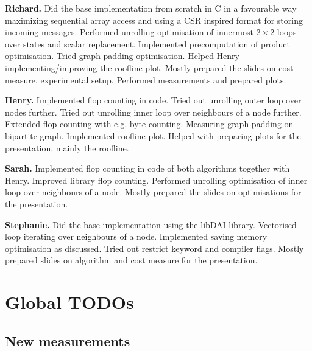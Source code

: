 \documentclass[letterpaper]{article}
\newcommand{\mypar}[1]{{\bf #1.}}
\begin{document}

\mypar{Richard} Did the base implementation from scratch in C in a favourable way maximizing sequential array access and using a CSR inspired format for storing incoming messages. Performed unrolling optimisation of innermost $2\times2$ loops over states and scalar replacement. Implemented precomputation of product optimisation. Tried graph padding optimisation. Helped Henry implementing/improving the roofline plot. Mostly prepared the slides on cost measure, experimental setup. Performed measurements and prepared plots.

\mypar{Henry} Implemented flop counting in code. Tried out unrolling outer loop over nodes further. Tried out unrolling inner loop over neighbours of a node further. Extended flop counting with e.g. byte counting. Measuring graph padding on bipartite graph. Implemented roofline plot. Helped with preparing plots for the presentation, mainly the roofline.

\mypar{Sarah} Implemented flop counting in code of both algorithms together with Henry. Improved library flop counting. Performed unrolling optimisation of inner loop over neighbours of a node. Mostly prepared the slides on optimisations for the presentation.

\mypar{Stephanie} Did the base implementation using the libDAI library. Vectorised loop iterating over neighbours of a node. Implemented saving memory optimisation as discussed. Tried out restrict keyword and compiler flags. Mostly prepared slides on algorithm and cost measure for the presentation.


\section{Global TODOs}


\subsection{New measurements}

\end{document}
